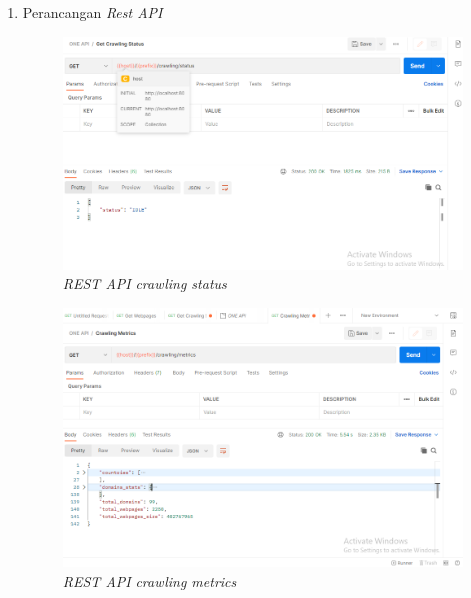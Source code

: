 \begin{enumerate}[label=\alph*)., leftmargin=1\parindent]
	\item{Perancangan \textit{Rest API}}
	
	\begin{figure}[H]
		\centering
		\includegraphics[keepaspectratio, width=13cm]{gambar/rest_crawling_status.png}
		\caption{\textit{REST API} \textit{crawling status}}
		\label{gambar:rest_crawling_status.png}
	\end{figure}
	
	
	\begin{figure}[H]
		\centering
		\includegraphics[keepaspectratio, width=13cm]{gambar/rest_crawling_metrics.png}
		\caption{\textit{REST API} \textit{crawling metrics}}
		\label{gambar:rest_crawling_metrics.png}
	\end{figure}
	

\end{enumerate}
